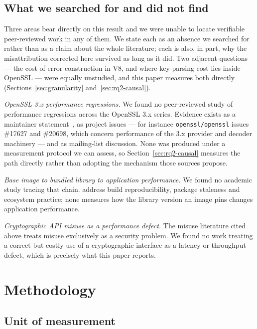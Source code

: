 \documentclass[pdflatex,sn-basic,twocolumn]{sn-jnl}%
\begin{document}
\subsection{What we searched for and did not find}\label{sec:gaps}

Three areas bear directly on this result and we were unable to locate
verifiable peer-reviewed work in any of them. We state each as an absence we
searched for rather than as a claim about the whole literature; each is also,
in part, why the misattribution corrected here survived as long as it did.
Two adjacent questions --- the cost of error construction in V8, and where
key-parsing cost lies inside OpenSSL --- were equally unstudied, and this paper
measures both directly (Sections~\ref{sec:granularity}
and~\ref{sec:rq2-causal}).

\emph{OpenSSL 3.x performance regressions.} We found no peer-reviewed study of
performance regressions across the OpenSSL 3.x series. Evidence exists as a
maintainer statement~\citep{pyca2026stateofopenssl}, as project issues --- for
instance \texttt{openssl/openssl} issues \#17627 and \#20698, which concern
performance of the 3.x provider and decoder machinery --- and as mailing-list
discussion. None was produced under a measurement protocol we can assess, so
Section~\ref{sec:rq2-causal} measures the path directly rather than adopting
the mechanism those sources propose.

\emph{Base image to bundled library to application performance.} We found no
academic study tracing that chain. \citet{malka2026docker} address
build reproducibility, \citet{zerouali2019outdated} package
staleness and \citet{cito2017empirical} ecosystem practice; none
measures how the library version an image pins changes application
performance.

\emph{Cryptographic API misuse as a performance defect.} The misuse literature
cited above treats misuse exclusively as a security problem. We found no work
treating a correct-but-costly use of a cryptographic interface as a latency or
throughput defect, which is precisely what this paper reports.

\section{Methodology}\label{sec:method}

\subsection{Unit of measurement}\label{sec:unit}
\end{document}
